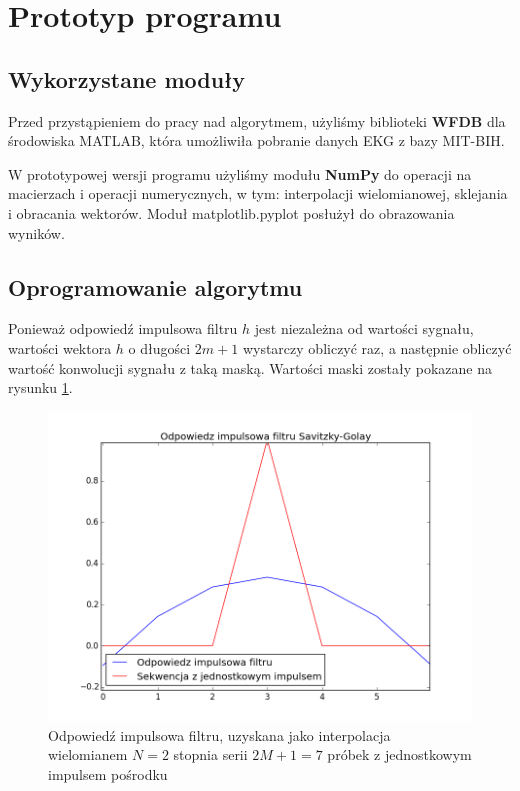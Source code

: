 \section{Prototyp programu}
\subsection{Wykorzystane moduły}
Przed przystąpieniem do pracy nad algorytmem, użyliśmy biblioteki \textbf{WFDB} dla środowiska MATLAB, która umożliwiła pobranie danych EKG z bazy MIT-BIH\cite{mit-bih}.

W prototypowej wersji programu użyliśmy modułu \textbf{NumPy} do operacji na macierzach i operacji numerycznych, w tym: interpolacji wielomianowej, sklejania i obracania wektorów. 
Moduł matplotlib.pyplot posłużył do obrazowania wyników.

\subsection{Oprogramowanie algorytmu}
Ponieważ odpowiedź impulsowa filtru $h$ jest niezależna od wartości sygnału, wartości wektora $h$ o długości $2m+1$ wystarczy obliczyć raz, a następnie obliczyć wartość konwolucji sygnału z taką maską. Wartości maski zostały pokazane na rysunku \ref{rys:impuls}.

\begin{figure}[!htb]
  \begin{center}
    \includegraphics[scale=0.8]
    {img/impulse.png}
  \end{center}
  \caption{Odpowiedź impulsowa filtru, uzyskana jako interpolacja wielomianem $N=2$ stopnia serii $2M+1=7$ próbek z jednostkowym impulsem pośrodku}
  \label{rys:impuls}
\end{figure}

